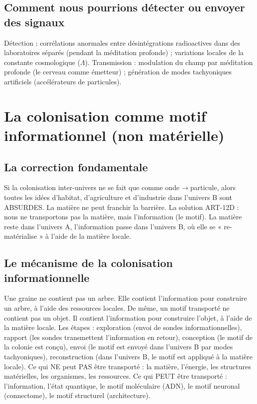 \documentclass[11pt,a4paper]{article}
\begin{document}
\subsection{Comment nous pourrions détecter ou envoyer des signaux}
Détection : corrélations anormales entre désintégrations radioactives dans des laboratoires séparés (pendant la méditation profonde) ; variations locales de la constante cosmologique ($\Lambda$). Transmission : modulation du champ par méditation profonde (le cerveau comme émetteur) ; génération de modes tachyoniques artificiels (accélérateurs de particules).

\section{La colonisation comme motif informationnel (non matérielle)}
\subsection{La correction fondamentale}
Si la colonisation inter-univers ne se fait que comme onde$\to$particule, alors toutes les idées d'habitat, d'agriculture et d'industrie dans l'univers B sont ABSURDES. La matière ne peut franchir la barrière. La solution ART-12D : nous ne transportons pas la matière, mais l'information (le motif). La matière reste dans l'univers A, l'information passe dans l'univers B, où elle se « re-matérialise » à l'aide de la matière locale.

\subsection{Le mécanisme de la colonisation informationnelle}
Une graine ne contient pas un arbre. Elle contient l'information pour construire un arbre, à l'aide des ressources locales. De même, un motif transporté ne contient pas un objet. Il contient l'information pour construire l'objet, à l'aide de la matière locale. Les étapes : exploration (envoi de sondes informationnelles), rapport (les sondes transmettent l'information en retour), conception (le motif de la colonie est conçu), envoi (le motif est envoyé dans l'univers B par modes tachyoniques), reconstruction (dans l'univers B, le motif est appliqué à la matière locale). Ce qui NE peut PAS être transporté : la matière, l'énergie, les structures matérielles, les organismes, les ressources. Ce qui PEUT être transporté : l'information, l'état quantique, le motif moléculaire (ADN), le motif neuronal (connectome), le motif structurel (architecture).
\end{document}
